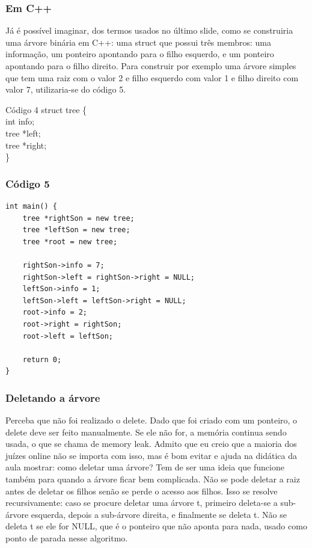 \documentclass{beamer}
\begin{document}
	\begin{frame}
	\frametitle{Em C++}
		Já é possível imaginar, dos termos usados no último slide,
		como se construiria uma árvore binária em C++: uma struct
		que possui três membros: uma informação, um ponteiro
		apontando para o filho esquerdo, e um ponteiro apontando para
		o filho direito. Para construir por exemplo uma árvore simples
		que tem uma raiz com o valor 2 e filho esquerdo com valor 1 e
		filho direito com valor 7, utilizaria-se do código 5.
		\begin{block}{Código 4}
		\hspace{10 pt} struct tree \{\\
		\hspace{20 pt} int info;\\
		\hspace{20 pt} tree *left;\\
		\hspace{20 pt} tree *right;\\
		\hspace{10 pt} \}
		\end{block}
	\end{frame}

	\begin{frame}[fragile]
	\frametitle{Código 5}
		\begin{lstlisting}
int main() {
    tree *rightSon = new tree;
    tree *leftSon = new tree;
    tree *root = new tree;

    rightSon->info = 7;
    rightSon->left = rightSon->right = NULL;
    leftSon->info = 1;
    leftSon->left = leftSon->right = NULL;
    root->info = 2;
    root->right = rightSon;
    root->left = leftSon;

    return 0;
}
		\end{lstlisting}
	\end{frame}

	\begin{frame}
	\frametitle{Deletando a árvore}
		Perceba que não foi realizado o delete. Dado que foi criado
		com um ponteiro, o delete deve ser feito manualmente. Se ele
		não for, a memória continua sendo usada, o que se chama de
		memory leak. Admito que eu creio que a maioria dos juízes
		online não se importa com isso, mas é bom evitar e ajuda na
		didática da aula mostrar: como deletar uma árvore? Tem de ser
		uma ideia que funcione também para quando a árvore ficar bem
		complicada. Não se pode deletar a raiz antes de deletar os
		filhos senão se perde o acesso aos filhos. Isso se resolve
		recursivamente: caso se procure deletar uma árvore t, primeiro
		deleta-se a sub-árvore esquerda, depois a sub-árvore direita, e
		finalmente se deleta t. Não se deleta t se ele for NULL, que é o
		ponteiro que não aponta para nada, usado como ponto de
		parada nesse algoritmo.
	\end{frame}
\end{document}
